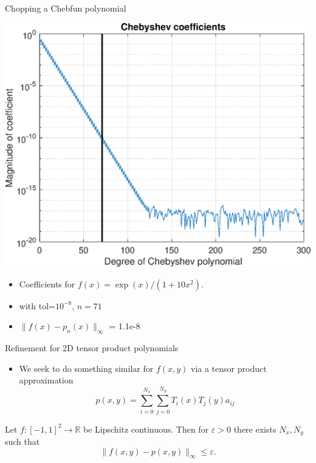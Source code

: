 \documentclass{beamer}
\newcommand{\R}{\mathbb{R}}
\begin{document}
\begin{frame}{Chopping a Chebfun polynomial}
\begin{center}
\includegraphics[scale = 0.4]{Cheb8.eps}
\end{center}

\begin{center}
\begin{itemize}
\item \begin{center} Coefficients for $f(x)=\exp(x)/(1+10 x^2)$. \end{center}
\item \begin{center} with tol=$10^{-8}$, $n=71$ \end{center}
\item \begin{center} $\| f(x)-p_n(x) \|_{\infty}$ = 1.1e-8 \end{center}
\end{itemize}
\end{center}
\end{frame}

\begin{frame}{Refinement for 2D tensor product polynomials}
\begin{itemize}
\item We seek to do something similar for $f(x,y)$ via a tensor product approximation $$ p(x,y) = \sum_{i=0}^{N_x} \sum_{j=0}^{N_y} T_i(x)T_j(y) a_{ij}$$
\end{itemize}

\begin{theorem} 
Let $f:[-1,1]^2 \to \R$ be Lipschitz continuous. Then for $\varepsilon>0$ there exists $N_x,N_y$ such that
$$
\|f(x,y)-p(x,y)\|_{\infty} \leq \varepsilon.
$$
 \end{theorem}

\end{frame}
\end{document}

